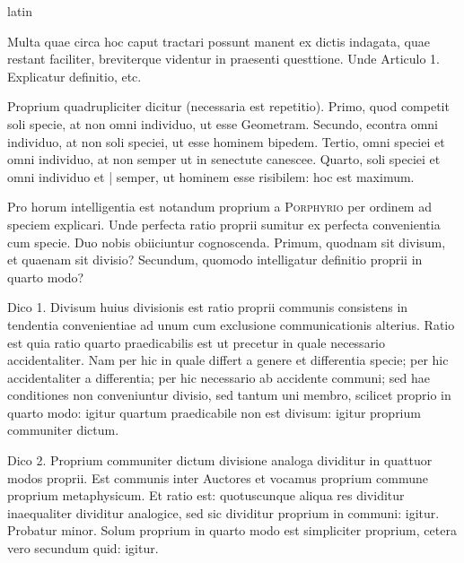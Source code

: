 \begin{otherlanguage*}{latin}
\pstart
{}
\pend

\pstart
Multa quae circa hoc caput tractari possunt manent ex dictis indagata, quae restant faciliter, breviterque videntur in praesenti questtione. Unde Articulo 1. Explicatur definitio, etc. 
\pend

\pstart
{}
\pend

\pstart
Proprium quadrupliciter dicitur (necessaria est repetitio). Primo, quod competit soli specie, at non omni individuo, ut esse Geometram. Secundo, econtra omni individuo, at non soli speciei, ut esse hominem bipedem. Tertio, omni speciei et omni individuo, at non semper ut in senectute canescee. Quarto, soli speciei et omni individuo et \textnormal{|} semper, ut hominem esse risibilem:
hoc est maximum. 
\pend

\pstart
Pro horum intelligentia est notandum proprium a \textsc{Porphyrio} per ordinem ad speciem explicari. Unde perfecta ratio proprii sumitur ex perfecta convenientia cum specie. Duo nobis obiiciuntur cognoscenda. Primum, quodnam sit divisum, et quaenam sit divisio? Secundum, quomodo intelligatur definitio proprii in quarto modo? 
\pend

\pstart
Dico 1. Divisum huius divisionis est ratio proprii communis consistens in tendentia convenientiae ad unum cum exclusione communicationis alterius. Ratio est quia ratio quarto praedicabilis est ut precetur in quale necessario accidentaliter. Nam per hic in quale differt a genere et differentia specie; per hic accidentaliter a differentia; per hic necessario ab accidente communi; sed hae conditiones non conveniuntur divisio, sed tantum uni membro, scilicet proprio in quarto modo:
igitur quartum praedicabile non est divisum:
igitur proprium communiter dictum. 
\pend

\pstart
Dico 2. Proprium communiter dictum divisione analoga dividitur in quattuor modos proprii. Est communis inter Auctores et vocamus proprium commune proprium metaphysicum. Et ratio est:
quotuscunque aliqua res dividitur inaequaliter dividitur analogice, sed sic dividitur proprium in communi:
igitur. Probatur minor. Solum proprium in quarto modo est simpliciter proprium, cetera vero secundum quid:
igitur. 
\pend


\end{otherlanguage*}
